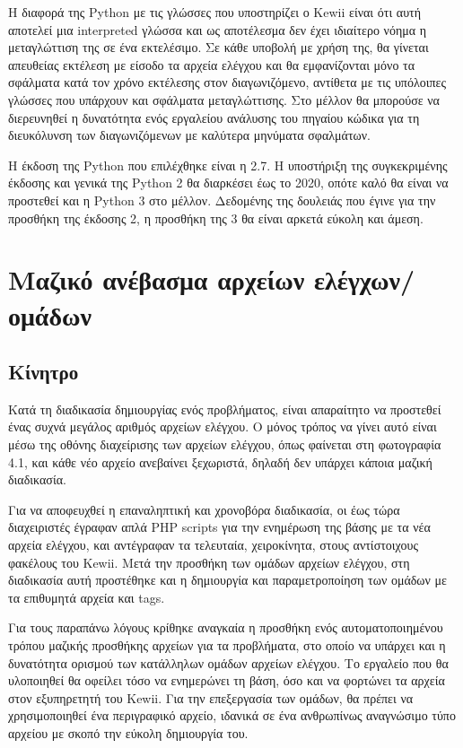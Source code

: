 \documentclass[diploma]{softlab-thesis}
\begin{document}
\bigskip

Η διαφορά της Python με τις γλώσσες που υποστηρίζει ο Kewii είναι ότι αυτή
αποτελεί μια interpreted γλώσσα και ως αποτέλεσμα δεν έχει ιδιαίτερο νόημα η
μεταγλώττιση της σε ένα εκτελέσιμο. Σε κάθε υποβολή με χρήση της, θα γίνεται
απευθείας εκτέλεση με είσοδο τα αρχεία ελέγχου και θα εμφανίζονται μόνο τα
σφάλματα κατά τον χρόνο εκτέλεσης στον διαγωνιζόμενο, αντίθετα με τις υπόλοιπες
γλώσσες που υπάρχουν και σφάλματα μεταγλώττισης. Στο μέλλον θα μπορούσε να
διερευνηθεί η δυνατότητα ενός εργαλείου ανάλυσης του πηγαίου κώδικα για τη
διευκόλυνση των διαγωνιζόμενων με καλύτερα μηνύματα σφαλμάτων.

\bigskip

Η έκδοση της Python που επιλέχθηκε είναι η 2.7. Η υποστήριξη της συγκεκριμένης
έκδοσης και γενικά της Python 2 θα διαρκέσει έως το 2020, οπότε καλό θα είναι
να προστεθεί και η Python 3 στο μέλλον. Δεδομένης της δουλειάς που έγινε για
την προσθήκη της έκδοσης 2, η προσθήκη της 3 θα είναι αρκετά εύκολη και άμεση.

\section{Μαζικό ανέβασμα αρχείων ελέγχων/ομάδων}

\subsection{Κίνητρο}

Κατά τη διαδικασία δημιουργίας ενός προβλήματος, είναι απαραίτητο να προστεθεί
ένας συχνά μεγάλος αριθμός αρχείων ελέγχου. Ο μόνος τρόπος να γίνει αυτό είναι
μέσω της οθόνης διαχείρισης των αρχείων ελέγχου, όπως φαίνεται στη
φωτογραφία 4.1, και κάθε νέο αρχείο ανεβαίνει ξεχωριστά, δηλαδή δεν υπάρχει
κάποια μαζική διαδικασία.

\bigskip

Για να αποφευχθεί η επαναληπτική και χρονοβόρα διαδικασία, οι έως τώρα διαχειριστές
έγραφαν απλά PHP scripts για την ενημέρωση της βάσης με τα νέα αρχεία ελέγχου,
και αντέγραφαν τα τελευταία, χειροκίνητα, στους αντίστοιχους φακέλους του Kewii.
Μετά την προσθήκη των ομάδων αρχείων ελέγχου, στη διαδικασία αυτή προστέθηκε και
η δημιουργία και παραμετροποίηση των ομάδων με τα επιθυμητά αρχεία και tags.

\bigskip

Για τους παραπάνω λόγους κρίθηκε αναγκαία η προσθήκη ενός αυτοματοποιημένου
τρόπου μαζικής προσθήκης αρχείων για τα προβλήματα, στο οποίο να υπάρχει και η
δυνατότητα ορισμού των κατάλληλων ομάδων αρχείων ελέγχου. Το εργαλείο που θα
υλοποιηθεί θα οφείλει τόσο να ενημερώνει τη βάση, όσο και να φορτώνει τα αρχεία
στον εξυπηρετητή του Kewii. Για την επεξεργασία των ομάδων, θα πρέπει να
χρησιμοποιηθεί ένα περιγραφικό αρχείο, ιδανικά σε ένα ανθρωπίνως αναγνώσιμο
τύπο αρχείου με σκοπό την εύκολη δημιουργία του.
\end{document}
